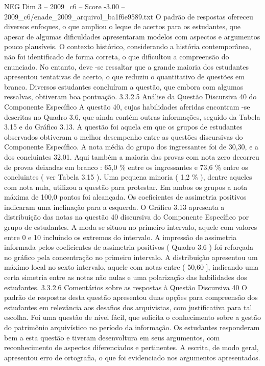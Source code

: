 \begin{textsample}{NEG Dim 3 – 2009\_c6 – Score -3.00 – 2009\_c6/enade\_2009\_arquivol\_ba1f6e9589.txt}
O padrão de respostas ofereceu diversos enfoques, o que ampliou o leque de acertos para os estudantes, que apesar de algumas dificuldades apresentaram modelos com aspectos e argumentos pouco plausíveis.
O contexto histórico, considerando a história contemporânea, não foi identificado de forma correta, o que dificultou a compreensão do enunciado.
No entanto, deve -se ressaltar que a grande maioria dos estudantes apresentou tentativas de acerto, o que reduziu o quantitativo de questões em branco.
Diversos estudantes concluíram a questão, que embora com algumas ressalvas, obtiveram boa pontuação. 3.3.2.5 Análise da Questão Discursiva 40 do Componente Específico A questão 40, cujas habilidades aferidas encontram -se descritas no Quadro 3.6, que ainda contém outras informações, seguido da Tabela 3.15 e do Gráfico 3.13.
A questão foi aquela em que os grupos de estudantes observados obtiveram o melhor desempenho entre as questões discursivas do Componente Específico.
A nota média do grupo dos ingressantes foi de 30,30, e a dos concluintes 32,01.
Aqui também a maioria das provas com nota zero decorreu de provas deixadas em branco : 65,0 \% entre os ingressantes e 73,6 \% entre os concluintes ( ver Tabela 3.15 ).
Uma pequena minoria ( 1,2 \% ), dentre aqueles com nota nula, utilizou a questão para protestar.
Em ambos os grupos a nota máxima de 100,0 pontos foi alcançada.
Os coeficientes de assimetria positivos indicaram uma inclinação para a esquerda.
O Gráfico 3.13 apresenta a distribuição das notas na questão 40 discursiva do Componente Específico por grupo de estudantes.
A moda se situou no primeiro intervalo, aquele com valores entre 0 e 10 incluindo os extremos do intervalo.
A impressão de assimetria informada pelos coeficientes de assimetria positivos ( Quadro 3.6 ) foi reforçada no gráfico pela concentração no primeiro intervalo.
A distribuição apresentou um máximo local no sexto intervalo, aquele com notas entre ( 50,60 ], indicando uma certa simetria entre as notas não nulas e uma polarização das habilidades dos estudantes. 3.3.2.6 Comentários sobre as respostas à Questão Discursiva 40 O padrão de respostas desta questão apresentou duas opções para compreensão dos estudantes em relevância aos desafios dos arquivistas, com justificativa para tal escolha.
Foi uma questão de nível fácil, que solicita o conhecimento sobre a gestão do patrimônio arquivístico no período da informação.
Os estudantes responderam bem a esta questão e tiveram desenvoltura em seus argumentos, com reconhecimento de aspectos diferenciados e pertinentes.
A escrita, de modo geral, apresentou erro de ortografia, o que foi evidenciado nos argumentos apresentados.

\end{textsample}
